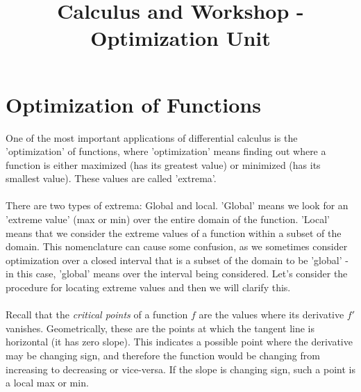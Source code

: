 \documentclass[12pt,a4paper]{article} %
\title{Calculus and Workshop - Optimization Unit}
\begin{document}
\maketitle

\section{Optimization of Functions}
One of the most important applications of differential calculus is the 'optimization' of functions, where 'optimization' means finding out where a function is either maximized (has its greatest value) or minimized (has its smallest value).  These values are called 'extrema'.  \\\\
There are two types of extrema: Global and local.  'Global' means we look for an 'extreme value' (max or min) over the entire domain of the function.  'Local' means that we consider the extreme values of a function within a subset of the domain.  This nomenclature can cause some confusion, as we sometimes consider optimization over a closed interval that is a subset of the domain to be 'global' - in this case, 'global' means over the interval being considered.  Let's consider the procedure for locating extreme values and then we will clarify this.\\\\

Recall that the \emph{critical points} of a function $f$ are the values where its derivative $f'$ vanishes.  Geometrically, these are the points at which the tangent line is horizontal (it has zero slope).  This indicates a possible point where the derivative may be changing sign, and therefore the function would be changing from increasing to decreasing or vice-versa.  If the slope is changing sign, such a point is a local max or min.  \\\\
\end{document}
